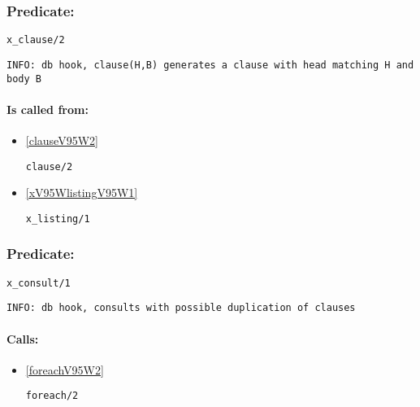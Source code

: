 \subsubsection{Predicate:} \label{xV95WclauseV95W2}

\begin{verbatim}
x_clause/2
\end{verbatim}

{\small \begin{verbatim}
INFO: db hook, clause(H,B) generates a clause with head matching H and body B

\end{verbatim}}
\paragraph{Is called from:} 
\begin{itemize}
\item \ref{clauseV95W2} 
\begin{verbatim}
clause/2
\end{verbatim}

\item \ref{xV95WlistingV95W1} 
\begin{verbatim}
x_listing/1
\end{verbatim}

\end{itemize}

\subsubsection{Predicate:} \label{xV95WconsultV95W1}

\begin{verbatim}
x_consult/1
\end{verbatim}

{\small \begin{verbatim}
INFO: db hook, consults with possible duplication of clauses

\end{verbatim}}
\paragraph{Calls:} 
\begin{itemize}
\item \ref{foreachV95W2} 
\begin{verbatim}
foreach/2
\end{verbatim}

\end{itemize}
